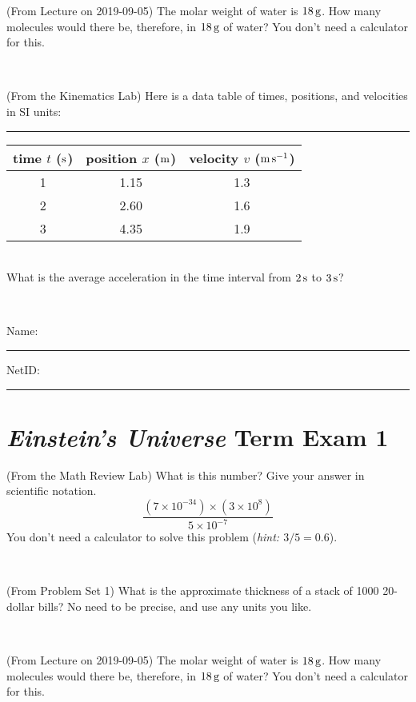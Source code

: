 \documentclass[12pt, letterpaper]{article}
\begin{document}
\begin{problem} (From Lecture on 2019-09-05)
The molar weight of water is $18\,\mathrm{g}$. How many molecules would there
be, therefore, in $18\,\mathrm{g}$ of water? You don't need a calculator for
this.
\end{problem}


\vfill ~

\begin{problem} (From the Kinematics Lab)
Here is a data table of times, positions, and velocities in SI units:\\
\rule{1.0in}{0pt}\begin{tabular}{c|c|c}
time $t$ ($\mathrm{s}$) & position $x$ ($\mathrm{m}$) & velocity $v$ ($\mathrm{m}\,\mathrm{s}^{-1}$) \\
\hline
1 & 1.15 & 1.3 \\
2 & 2.60 & 1.6 \\
3 & 4.35 & 1.9 \\
\hline
\end{tabular}\\
What is the average acceleration in the time interval from $2\,\mathrm{s}$ to $3\,\mathrm{s}$?
\end{problem}


\vfill ~


\cleardoublepage



\noindent
Name: \rule[-1ex]{0.60\textwidth}{0.1pt}
NetID: \rule[-1ex]{0.20\textwidth}{0.1pt}

\section*{\textsl{Einstein's Universe} Term Exam 1}
\setcounter{problem}{1}


\begin{problem} (From the Math Review Lab)
What is this number? Give your answer in scientific notation.
$$
\frac{(7\times10^{-34})\times(3\times10^8)}{5\times10^{-7}}
$$
You don't need a calculator to solve this problem (\textit{hint: $3/5=0.6$}).
\end{problem}


\vfill ~

\begin{problem} (From Problem Set 1)
What is the approximate thickness of a stack of 1000 20-dollar bills?
No need to be precise, and use any units you like.
\end{problem}


\vfill ~

\begin{problem} (From Lecture on 2019-09-05)
The molar weight of water is $18\,\mathrm{g}$. How many molecules would there
be, therefore, in $18\,\mathrm{g}$ of water? You don't need a calculator for
this.
\end{problem}
\end{document}
